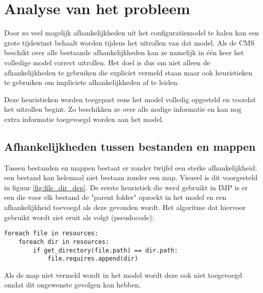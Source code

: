 \chapter{Analyse van het probleem}
\label{chapter:analyse}
Door zo veel mogelijk afhankelijkheden uit het configuratiemodel te halen kan een grote  tijdswinst behaalt worden tijdens het uitrollen van dat model.
Als de CMS beschikt over alle bestaande afhankelijkheden kan ze namelijk in \'e\'en keer het volledige model correct uitrollen.
Het doel is dus om niet alleen de afhankelijkheden te gebruiken die expliciet vermeld staan maar ook heuristieken te gebruiken om impliciete afhankelijkheden af te leiden.

Deze heuristieken worden toegepast eens het model volledig opgesteld en voordat het uitrollen begint.
Zo beschikken ze over alle nodige informatie en kan nog extra informatie toegevoegd worden aan het model.

\section{Afhankelijkheden tussen bestanden en mappen}
\label{subs:bestanden_en_mappen}
Tussen bestanden en mappen bestaat er zonder twijfel een sterke afhankelijkheid: een bestand kan helemaal niet bestaan zonder een map.
Visueel is dit voorgesteld in figuur \ref{fig:file_dir_dep}.
De eerste heuristiek die werd gebruikt in IMP is er een die voor elk bestand de "parent folder" opzoekt in het model en een afhankelijkheid toevoegd als deze gevonden wordt.
Het algoritme dat hiervoor gebruikt wordt ziet eruit als volgt (pseudocode):
\begin{lstlisting}
foreach file in resources:
    foreach dir in resources:
        if get_directory(file.path) == dir.path:
            file.requires.append(dir)
\end{lstlisting}

Als de map niet vermeld wordt in het model wordt deze ook niet toegevoegd omdat dit ongewenste gevolgen kan hebben. 



